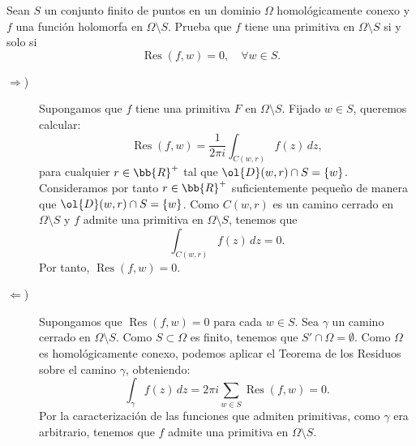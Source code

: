 \documentclass[12pt]{article}
\DeclareMathOperator{\Res}{Res}
\begin{document}
    \newpage
    \setcounter{ejercicio}{0}


    \begin{ejercicio}[2.5 puntos]
         Sean $S$ un conjunto finito de puntos en un dominio $\Omega$ homológicamente conexo y $f$ una función holomorfa en $\Omega \setminus S$. Prueba que $f$ tiene una primitiva en $\Omega \setminus S$ si y solo si
        \[
            \Res(f, w) = 0, \quad \forall w \in S.
        \]
        \begin{description}
            \item[$\Longrightarrow$)] Supongamos que $f$ tiene una primitiva $F$ en $\Omega \setminus S$. Fijado $w\in S$, queremos calcular:
            \[
                \Res(f, w) = \frac{1}{2\pi i} \int_{C(w, r)} f(z) \, dz,
            \]
            para cualquier $r\in \bb{R}^+$ tal que $\ol{D}(w,r)\cap S=\{w\}$. Consideramos por tanto $r\in \bb{R}^+$ suficientemente pequeño de manera que $\ol{D}(w,r)\cap S=\{w\}$. Como $C(w, r)$ es un camino cerrado en $\Omega \setminus S$ y $f$ admite una primitiva en $\Omega \setminus S$, tenemos que
            \[
                \int_{C(w, r)} f(z) \, dz = 0.
            \]
            Por tanto, $\Res(f, w) = 0$.

            \item[$\Longleftarrow$)] Supongamos que $\Res(f, w) = 0$ para cada $w \in S$. Sea $\gamma$ un camino cerrado en $\Omega \setminus S$. Como $S\subset \Omega$ es finito, tenemos que $S'\cap \Omega=\emptyset$. Como $\Omega$ es homológicamente conexo, podemos aplicar el Teorema de los Residuos sobre el camino $\gamma$, obteniendo:
            \[
                \int_{\gamma} f(z) \, dz = 2\pi i \sum_{w\in S} \Res(f, w) = 0.
            \]
            Por la caracterización de las funciones que admiten primitivas, como $\gamma$ era arbitrario, tenemos que $f$ admite una primitiva en $\Omega \setminus S$.
        \end{description}
    \end{ejercicio}
\end{document}
